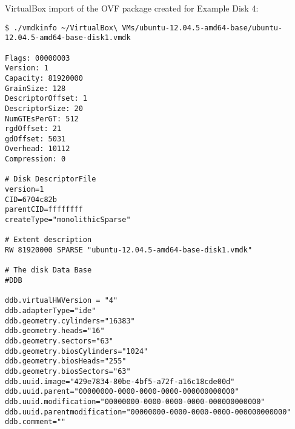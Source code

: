 \documentclass{article}
\begin{document}
VirtualBox import of the OVF package created for Example Disk 4:

\begin{verbatim}
$ ./vmdkinfo ~/VirtualBox\ VMs/ubuntu-12.04.5-amd64-base/ubuntu-12.04.5-amd64-base-disk1.vmdk 

Flags: 00000003
Version: 1
Capacity: 81920000
GrainSize: 128
DescriptorOffset: 1
DescriptorSize: 20
NumGTEsPerGT: 512
rgdOffset: 21
gdOffset: 5031
Overhead: 10112
Compression: 0

# Disk DescriptorFile
version=1
CID=6704c82b
parentCID=ffffffff
createType="monolithicSparse"

# Extent description
RW 81920000 SPARSE "ubuntu-12.04.5-amd64-base-disk1.vmdk"

# The disk Data Base 
#DDB

ddb.virtualHWVersion = "4"
ddb.adapterType="ide"
ddb.geometry.cylinders="16383"
ddb.geometry.heads="16"
ddb.geometry.sectors="63"
ddb.geometry.biosCylinders="1024"
ddb.geometry.biosHeads="255"
ddb.geometry.biosSectors="63"
ddb.uuid.image="429e7834-80be-4bf5-a72f-a16c18cde00d"
ddb.uuid.parent="00000000-0000-0000-0000-000000000000"
ddb.uuid.modification="00000000-0000-0000-0000-000000000000"
ddb.uuid.parentmodification="00000000-0000-0000-0000-000000000000"
ddb.comment=""
\end{verbatim}
\end{document}
